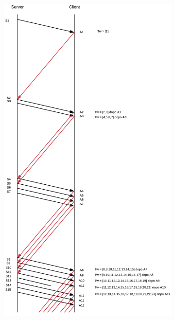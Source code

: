 \documentclass[10pt,a4paper]{article}
\begin{document}
\begin{enumerate}
\begin{figure}[H]
\begin{subfigure}[b]{9cm}
		  \includegraphics[width=\textwidth]{Esame1262019_Conperdite1}
		\end{subfigure}
		\begin{subfigure}[b]{9cm}

\end{subfigure}
\end{figure}
\end{enumerate}
\end{document}
